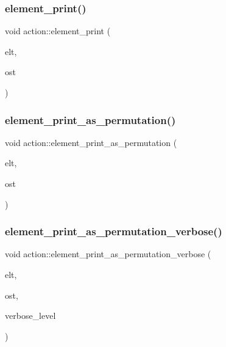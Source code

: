 \mbox{\label{classaction_ae38c3ef3c1125213733d63c6fc3c40cd}} 
\subsubsection{\texorpdfstring{element\+\_\+print()}{element\_print()}}
{\footnotesize\ttfamily void action\+::element\+\_\+print (\begin{DoxyParamCaption}\item[{void $\ast$}]{elt,  }\item[{ostream \&}]{ost }\end{DoxyParamCaption})}

\mbox{\label{classaction_a2975618a8203187b688a67c947150bb8}} 
\subsubsection{\texorpdfstring{element\+\_\+print\+\_\+as\+\_\+permutation()}{element\_print\_as\_permutation()}}
{\footnotesize\ttfamily void action\+::element\+\_\+print\+\_\+as\+\_\+permutation (\begin{DoxyParamCaption}\item[{void $\ast$}]{elt,  }\item[{ostream \&}]{ost }\end{DoxyParamCaption})}

\mbox{\label{classaction_a5caac519740ebc92a8e1aa2c8dbaa0f3}} 
\subsubsection{\texorpdfstring{element\+\_\+print\+\_\+as\+\_\+permutation\+\_\+verbose()}{element\_print\_as\_permutation\_verbose()}}
{\footnotesize\ttfamily void action\+::element\+\_\+print\+\_\+as\+\_\+permutation\+\_\+verbose (\begin{DoxyParamCaption}\item[{void $\ast$}]{elt,  }\item[{ostream \&}]{ost,  }\item[{\mbox{\hyperlink{galois_8h_a09fddde158a3a20bd2dcadb609de11dc}{I\+NT}}}]{verbose\+\_\+level }\end{DoxyParamCaption})}

